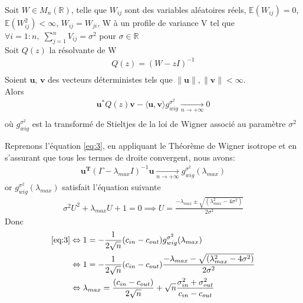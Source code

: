 \begin{theorem}
Soit $W \in M_{n}(\mathbb{R})$, telle que $W_{ij}$ sont des variables aléatoires réels, $\mathbb{E}(W_{ij}) = 0$, $\mathbb{E}(W_{ij}^2) < \infty$, $W_{ij} = W_{ji}$, W à un profile de variance V tel que $\forall i = 1:n , \; \sum_{j=1}^{n}V_{ij} = \sigma^2$ pour $\sigma \in \mathbb{R}$\\
Soit $Q(z)$ la résolvante de W
\begin{align*} 
Q(z) = (W - zI)^{-1}\\
\end{align*}
Soient $\mathbf{u}$, $\mathbf{v}$ des vecteurs déterministes tels que $\|\mathbf{u}\|, \|\mathbf{v}\| < \infty$.\\
Alors 
\begin{align*} 
\mathbf{u}^*Q(z)\mathbf{v} - \langle \mathbf{u}, \mathbf{v} \rangle g_{wig}^{\sigma^2} \xrightarrow[n \to +\infty]{} 0\\
\end{align*}
où $g_{wig}^{\sigma^2}$ est la transformé de Stieltjes de la loi de Wigner associé au paramètre $\sigma^2$\\
\end{theorem}

Reprenons l’équation \eqref{eq:3}, en appliquant le Théorème de Wigner isotrope et en s'assurant que tous les termes de droite convergent, nous avons:
\begin{align*}
\mathbf{u^T}(\Gamma - \lambda_{max}I)^{-1}\mathbf{u} \xrightarrow[n \to +\infty]{} g_{wig}^{\sigma^2}(\lambda_{max})
\end{align*}
or $g_{wig}^{\sigma^2}(\lambda_{max})$ satisfait l'équation suivante 
\begin{align}
	\sigma^2U^2+\lambda_{max}U+1=0 \implies U = \frac{- \lambda_{max} \pm \sqrt{(\lambda_{max}^2 - 4\sigma^2)}}{2\sigma^2}
\end{align}
Donc
\begin{align}
	\eqref{eq:3} &\Leftrightarrow1 = -\frac{1}{2\sqrt{n}}(c_{in} - c_{out}) g_{wig}^{\sigma^2}(\lambda_{max}) \nonumber\\
	&\Leftrightarrow 1 = -\frac{1}{2\sqrt{n}}(c_{in} - c_{out}) \frac{- \lambda_{max} - \sqrt{(\lambda_{max}^2 - 4\sigma^2)}}{2\sigma^2} \nonumber\\
	&\Leftrightarrow \lambda_{max} = \frac{(c_{in} - c_{out})}{2\sqrt{n}} + \sqrt{n}\frac{\sigma_{in}^2 + \sigma_{out}^2}{c_{in} - c_{out}} \label{z1}
\end{align}

